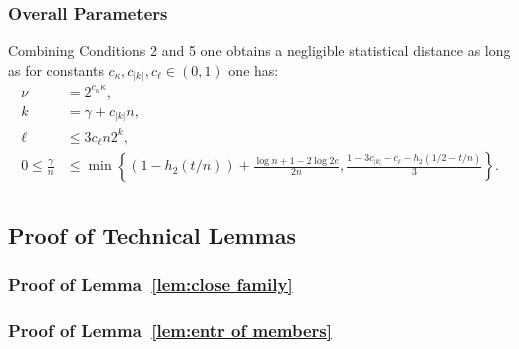 \subsubsection{Overall Parameters}
Combining Conditions 2 and 5 one obtains a negligible statistical distance as long as for constants $c_\kappa, c_{|k|}, c_{\ell}\in (0,1)$ one has:
\begin{align*}
\nu &= 2^{c_{\kappa}\kappa},\\
k &=\gamma + c_{|k|}n,\\
\ell&\le 3c_{\ell}n2^k,\\
0\le \frac{\gamma}{n} &\le \min\left\{(1-h_2(t/n)) +\frac{\log{n}+1-2\log{2e}}{2n}, \frac{1-3c_{|k|} - c_{\ell}-h_2(1/2-t/n)}{3}\right\}.\\
\end{align*}
%
%

\subsection{Proof of Technical Lemmas}
\label{sec:tech lemmas}
\subsubsection{Proof of Lemma~\ref{lem:close family}}



\subsubsection{Proof of Lemma~\ref{lem:entr of members}}

